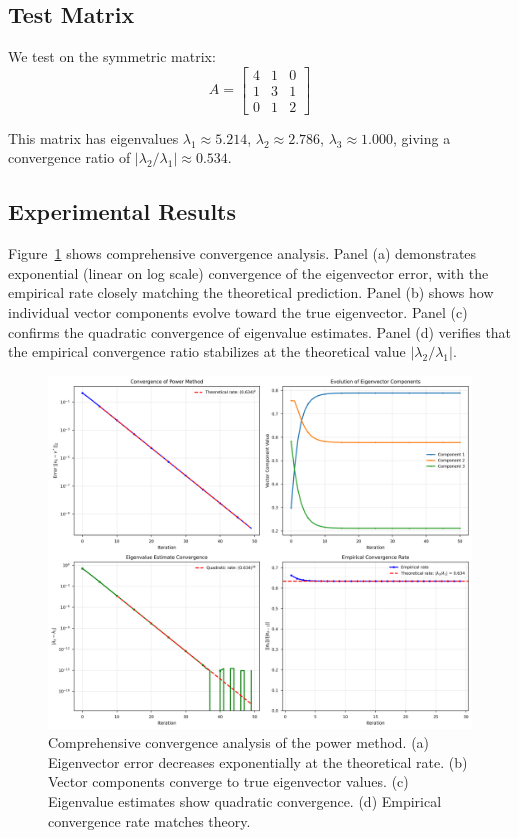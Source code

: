 \documentclass[11pt,a4paper]{article}
\begin{document}
\subsection{Test Matrix}

We test on the symmetric matrix:
\begin{equation}
A = \begin{bmatrix} 4 & 1 & 0 \\ 1 & 3 & 1 \\ 0 & 1 & 2 \end{bmatrix}
\end{equation}

This matrix has eigenvalues $\lambda_1 \approx 5.214$, $\lambda_2 \approx 2.786$, $\lambda_3 \approx 1.000$, giving a convergence ratio of $|\lambda_2/\lambda_1| \approx 0.534$.

\subsection{Experimental Results}

Figure~\ref{fig:convergence} shows comprehensive convergence analysis. Panel (a) demonstrates exponential (linear on log scale) convergence of the eigenvector error, with the empirical rate closely matching the theoretical prediction. Panel (b) shows how individual vector components evolve toward the true eigenvector. Panel (c) confirms the quadratic convergence of eigenvalue estimates. Panel (d) verifies that the empirical convergence ratio stabilizes at the theoretical value $|\lambda_2/\lambda_1|$.

\begin{figure}[t]
    \centering
    \includegraphics[width=\textwidth]{convergence_analysis.png}
    \caption{Comprehensive convergence analysis of the power method. (a) Eigenvector error decreases exponentially at the theoretical rate. (b) Vector components converge to true eigenvector values. (c) Eigenvalue estimates show quadratic convergence. (d) Empirical convergence rate matches theory.}
    \label{fig:convergence}
\end{figure}
\end{document}

